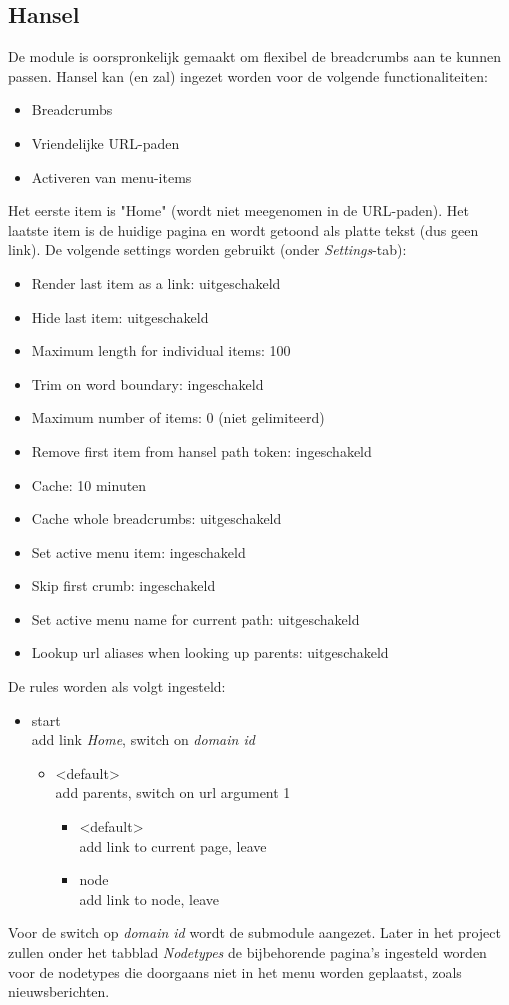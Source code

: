 \subsection{Hansel}

De module  is oorspronkelijk gemaakt om flexibel de breadcrumbs aan te kunnen passen. Hansel kan (en zal) ingezet worden voor de volgende functionaliteiten:
\begin{itemize}
\item Breadcrumbs
\item Vriendelijke URL-paden
\item Activeren van menu-items
\end{itemize}
Het eerste item is "Home" (wordt niet meegenomen in de URL-paden). Het laatste item is de huidige pagina en wordt getoond als platte tekst (dus geen link). De volgende settings worden gebruikt (onder \emph{Settings}-tab):
\begin{itemize}
\item Render last item as a link: uitgeschakeld
\item Hide last item: uitgeschakeld
\item Maximum length for individual items: 100
\item Trim on word boundary: ingeschakeld
\item Maximum number of items: 0 (niet gelimiteerd)
\item Remove first item from hansel path token: ingeschakeld
\item Cache: 10 minuten
\item Cache whole breadcrumbs: uitgeschakeld
\item Set active menu item: ingeschakeld
\item Skip first crumb: ingeschakeld
\item Set active menu name for current path: uitgeschakeld
\item Lookup url aliases when looking up parents: uitgeschakeld
\end{itemize}
De rules worden als volgt ingesteld:
\begin{itemize}
\item start \\ add link \emph{Home}, switch on \emph{domain id}
\begin{itemize}
\item \textless default\textgreater \\  add parents, switch on url argument 1
\begin{itemize}
\item \textless default\textgreater \\ add link to current page, leave
\item node \\ add link to node, leave
\end{itemize}
\end{itemize}
\end{itemize}
Voor de switch op \emph{domain id} wordt de submodule  aangezet.
Later in het project zullen onder het tabblad \emph{Nodetypes} de bijbehorende pagina's ingesteld worden voor de nodetypes die doorgaans niet in het menu worden geplaatst, zoals nieuwsberichten.

